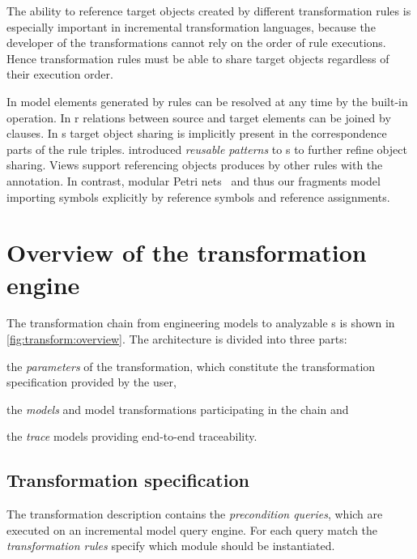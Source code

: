 The ability to reference target objects created by different transformation rules is especially important in incremental transformation languages, because the developer of the transformations cannot rely on the order of rule executions. Hence transformation rules must be able to share target objects regardless of their execution order.

In  model elements generated by rules can be resolved at any time by the built-in  operation. In r relations between source and target elements can be joined by  clauses. In s target object sharing is implicitly present in the correspondence parts of the rule triples. \citet{Greenyer11advanced} introduced \emph{reusable patterns} to s to further refine object sharing.  Views support referencing objects produces by other rules with the  annotation. In contrast, modular Petri nets~\citep{Kindler09modular} and thus our  fragments model importing symbols explicitly by reference symbols and reference assignments.


\section{Overview of the transformation engine}
\label{chap:transfrom:specify}

The transformation chain from engineering models to analyzable s is shown in \vref{fig:transform:overview}. The architecture is divided into three parts: \begin{inparaenum}
\item the \emph{parameters} of the transformation, which constitute the transformation specification provided by the user,
\item the \emph{models} and model transformations participating in the chain and
\item the \emph{trace} models providing end-to-end traceability.
\end{inparaenum}

\subsection{Transformation specification}

The transformation description contains the \emph{precondition queries}, which are executed on an incremental model query engine. For each query match the \emph{transformation rules} specify which \emph{} module should be instantiated.

